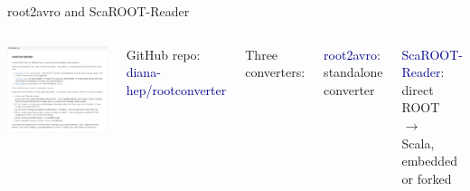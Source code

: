 \documentclass{beamer}
\begin{document}
\begin{frame}{root2avro and ScaROOT-Reader}
\vspace{0.5 cm}
\begin{columns}
\includegraphics[width=\linewidth]{rootconverter.png}

GitHub repo:
\textcolor{darkblue}{diana-hep/rootconverter}

\vspace{0.5 cm}
Three converters:

\vspace{0.2 cm}
\textcolor{darkblue}{root2avro}: \\
\hspace{0.25 cm} standalone \\
\hspace{0.25 cm} converter

\vspace{0.2 cm}
\textcolor{darkblue}{ScaROOT-Reader}: \\
\hspace{0.25 cm} direct ROOT $\to$ \\
\hspace{0.25 cm} Scala, embedded \\
\hspace{0.25 cm} or forked
\end{columns}
\end{frame}
\end{document}
